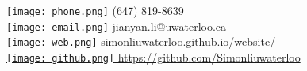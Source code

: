 \documentclass[margin,line]{resume}
\begin{document}
{
    \hfill \texttt{[image: phone.png]} (647) 819-8639 \vspace{0mm}\\\vspace{0mm}%
    \hfill \href{mailto:jianyan.li@uwaterloo.ca}{\texttt{[image: email.png]} jianyan.li@uwaterloo.ca}       \vspace{0mm}\\\vspace{0mm}%
    \hfill \href{https://simonliuwaterloo.github.io/website/}{\texttt{[image: web.png]} simonliuwaterloo.github.io/website/}           \vspace{0mm}\\\vspace{0mm}%
    \hfill \href{https://github.com/Simonliuwaterloo}{{\texttt{[image: github.png]} https://github.com/Simonliuwaterloo}} \vspace{0mm}\\\vspace{-14mm}%
}
\end{document}
